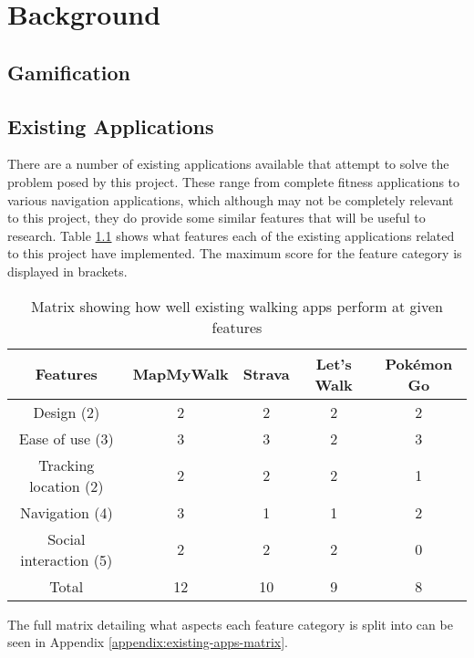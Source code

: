 \chapter{Background}

\section{Gamification}


\section{Existing Applications}


There are a number of existing applications available that attempt to solve the problem posed by this project. These range from complete fitness applications to various navigation applications, which although may not be completely relevant to this project, they do provide some similar features that will be useful to research. Table \ref{table:existing-walking-apps} shows what features each of the existing applications related to this project have implemented. The maximum score for the feature category is displayed in brackets.

\begin{table}[h]
  \centering
  \begin{tabular}{|c||c|c|c|c|}
    \hline
    Features & MapMyWalk & Strava & Let's Walk & Pok\'{e}mon Go\\
    \hline
    \hline
    Design (2) & 2 & 2 & 2 & 2\\
    \hline
    Ease of use (3) & 3 & 3 & 2 & 3\\
    \hline
    Tracking location (2) & 2 & 2 & 2 & 1\\
    \hline
    Navigation (4) & 3 & 1 & 1 & 2\\
    \hline
    Social interaction (5) & 2 & 2 & 2 & 0\\
    \hline
    \hline
    Total & 12 & 10 & 9 & 8\\
    \hline
  \end{tabular}
  \caption{Matrix showing how well existing walking apps perform at given features}
  \label{table:existing-walking-apps}
\end{table}

The full matrix detailing what aspects each feature category is split into can be seen in Appendix \ref{appendix:existing-apps-matrix}.

